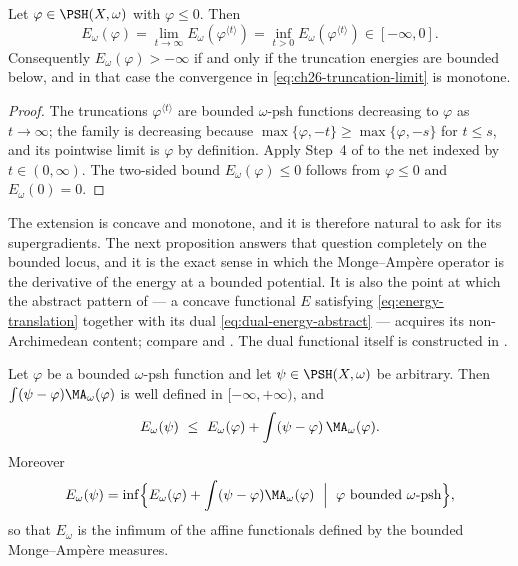 \begin{proposition}
\label{prop:ch26-truncation-limit}
Let $\varphi\in\PSH(X,\omega)$ with $\varphi\leq0$.  Then
\begin{equation}
\label{eq:ch26-truncation-limit}
 E_\omega(\varphi)
 =\lim_{t\to\infty}E_\omega(\varphi^{\langle t\rangle})
 =\inf_{t>0}E_\omega(\varphi^{\langle t\rangle})
 \in[-\infty,0].
\end{equation}
Consequently $E_\omega(\varphi)>-\infty$ if and only if the truncation
energies are bounded below, and in that case the convergence in
\eqref{eq:ch26-truncation-limit} is monotone.
\end{proposition}

\begin{proof}
The truncations $\varphi^{\langle t\rangle}$ are bounded $\omega$-psh
functions decreasing to $\varphi$ as $t\to\infty$; the family is
decreasing because $\max\{\varphi,-t\}\geq\max\{\varphi,-s\}$ for
$t\leq s$, and its pointwise limit is $\varphi$ by definition.  Apply
Step~4 of  to the net indexed by
$t\in(0,\infty)$.  The two-sided bound $E_\omega(\varphi)\leq0$ follows
from $\varphi\leq0$ and $E_\omega(0)=0$.
\end{proof}

The extension is concave and monotone, and it is therefore natural to ask for
its supergradients.  The next proposition answers that question completely on
the bounded locus, and it is the exact sense in which the Monge--Amp\`ere
operator is the derivative of the energy at a bounded potential.  It is also
the point at which the abstract pattern of  ---
a concave functional $E$ satisfying \eqref{eq:energy-translation} together
with its dual \eqref{eq:dual-energy-abstract} --- acquires its
non-Archimedean content; compare  and
.  The dual functional itself is constructed
in .

\begin{proposition}
\label{prop:ch26-supergradient}
Let $\varphi$ be a bounded $\omega$-psh function and let
$\psi\in\PSH(X,\omega)$ be arbitrary.  Then
$\int(\psi-\varphi)\MA_\omega(\varphi)$ is well defined in
$[-\infty,+\infty)$, and
\begin{equation}
\label{eq:ch26-supergradient}
 E_\omega(\psi)\ \leq\ E_\omega(\varphi)
   +\int(\psi-\varphi)\,\MA_\omega(\varphi).
\end{equation}
Moreover
\begin{equation}
\label{eq:ch26-energy-as-infimum}
 E_\omega(\psi)
 =\inf\Bigl\{E_\omega(\varphi)+\int(\psi-\varphi)\MA_\omega(\varphi)
   \ \Bigm|\ \varphi\ \text{bounded }\omega\text{-psh}\Bigr\},
\end{equation}
so that $E_\omega$ is the infimum of the affine functionals defined by the
bounded Monge--Amp\`ere measures.
\end{proposition}

